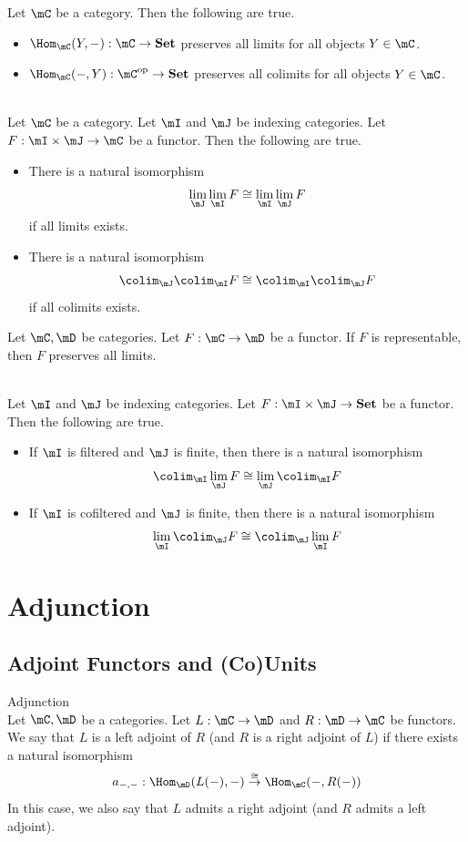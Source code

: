 \documentclass[a4paper]{article}
\begin{document}
\begin{prp}{}{} Let $\mC$ be a category. Then the following are true. 
\begin{itemize}
\item $\Hom_\mC(Y,-):\mC\to\bold{Set}$ preserves all limits for all objects $Y\in\mC$. 
\item $\Hom_\mC(-,Y):\mC^\text{op}\to\bold{Set}$ preserves all colimits for all objects $Y\in\mC$. 
\end{itemize}
\end{prp}

\begin{prp}{}{}\\
Let $\mC$ be a category. Let $\mI$ and $\mJ$ be indexing categories. Let $F:\mI\times\mJ\to\mC$ be a functor. Then the following are true. 
\begin{itemize}
\item There is a natural isomorphism $$\lim_\mJ\lim_\mI F\cong\lim_\mI\lim_\mJ F$$ if all limits exists. 
\item There is a natural isomorphism $$\colim_\mJ\colim_\mI F\cong\colim_\mI\colim_\mJ F$$ if all colimits exists. 
\end{itemize}
\end{prp}

\begin{crl}{}{} Let $\mC,\mD$ be categories. Let $F:\mC\to\mD$ be a functor. If $F$ is representable, then $F$ preserves all limits. 
\end{crl}

\begin{prp}{}{}\\
Let $\mI$ and $\mJ$ be indexing categories. Let $F:\mI\times\mJ\to\bold{Set}$ be a functor. Then the following are true. 
\begin{itemize}
\item If $\mI$ is filtered and $\mJ$ is finite, then there is a natural isomorphism $$\colim_\mI\lim_\mJ F\cong\lim_\mJ\colim_\mI F$$
\item If $\mI$ is cofiltered and $\mJ$ is finite, then there is a natural isomorphism $$\lim_\mI\colim_\mJ F\cong\colim_\mJ\lim_\mI F$$
\end{itemize}
\end{prp}

\pagebreak
\section{Adjunction}
\subsection{Adjoint Functors and (Co)Units}
\begin{defn}{Adjunction}{}\\
Let $\mC,\mD$ be a categories. Let $L:\mC\to\mD$ and $R:\mD\to\mC$ be functors. We say that $L$ is a left adjoint of $R$ (and $R$ is a right adjoint of $L$) if there exists a natural isomorphism $$a_{-,-}:\Hom_\mD(L(-),-)\overset{\cong}{\to}\Hom_\mC(-,R(-))$$ In this case, we also say that $L$ admits a right adjoint (and $R$ admits a left adjoint). 
\end{defn}
\end{document}
